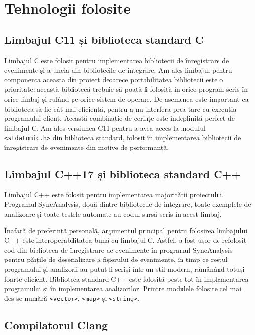 \section{Tehnologii folosite}

\subsection{Limbajul C11 și biblioteca standard C}

Limbajul C\cite{C} este folosit pentru implementarea bibliotecii de
înregistrare de evenimente și a uneia din bibliotecile de integrare.
Am ales limbajul pentru componenta aceasta din proiect deoarece
portabilitatea bibliotecii este o prioritate: această bibliotecă trebuie
să poată fi folosită în orice program scris în orice limbaj și rulând pe
orice sistem de operare. De asemenea este important ca biblioteca să fie
cât mai eficientă, pentru a nu interfera prea tare cu execuția
programului client. Această combinație de cerințe este îndeplinită
perfect de limbajul C. Am ales versiunea C11 pentru a avea acces la
modulul \lstinline{<stdatomic.h>} din biblioteca standard, folosit în
implementarea bibliotecii de înregistrare de evenimente din motive de
performanță.

\subsection{Limbajul C++17 și biblioteca standard C++}

Limbajul C++\cite{CXX} este folosit pentru implementarea majorității
proiectului. Programul SyncAnalysis, două dintre bibliotecile de
integrare, toate exemplele de analizoare și toate testele automate au
codul sursă scris în acest limbaj.

Înafară de preferință personală, argumentul principal pentru folosirea
limbajului C++ este interoperabilitatea bună cu limbajul C. Astfel, a
fost ușor de refolosit cod din biblioteca de înregistrare de evenimente
în programul SyncAnalysis pentru părțile de deserializare a fișierului
de evenimente, în timp ce restul programului și analizorii au putut fi
scriși într-un stil modern, rămânând totuși foarte eficient. Biblioteca
standard C++ este folosită peste tot în implementarea programului și în
implementarea analizorilor. Printre modulele folosite cel mai des se
numără \lstinline{<vector>}, \lstinline{<map>} și \lstinline{<string>}.

\subsection{Compilatorul Clang}

